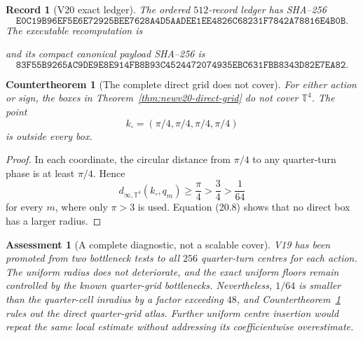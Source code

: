 \documentclass[11pt,oneside]{article}
\newtheorem{assessment}[theorem]{Assessment}
\newtheorem{record}[theorem]{Record}
\newtheorem{countertheorem}[theorem]{Countertheorem}
\theoremstyle{definition}
\theoremstyle{remark}
\begin{document}
\begin{record}[V20 exact ledger]
\label{rec:newv20-ledger}
The ordered \(512\)-record ledger has SHA--256
\[
\texttt{E0C19B96EF5E6E72925BEE7628A4D5AADEE1EE4826C68231F7842A78816E4B0B}.
                                                               \tag{20.9}
\]
The executable recomputation is
\begin{center}
\footnotesize
{}
\end{center}
and its compact canonical payload SHA--256 is
\[
\texttt{83F55B9265AC9DE9E8E914FB8B93C4524472074935EBC631FBB8343D82E7EA82}.
                                                               \tag{20.10}
\]
\end{record}

\begin{countertheorem}[The complete direct grid does not cover]
\label{ctr:newv20-no-cover}
For either action or sign, the boxes in
Theorem~\ref{thm:newv20-direct-grid} do not cover
\(\mathbb T^4\).  The point
\[
 k_\square=(\pi/4,\pi/4,\pi/4,\pi/4)                    \tag{20.11}
\]
is outside every box.
\end{countertheorem}

\begin{proof}
In each coordinate, the circular distance from \(\pi/4\) to any
quarter-turn phase is at least \(\pi/4\).  Hence
\[
 d_{\infty,\mathbb T^4}(k_\square,q_m)
 \ge\frac{\pi}{4}>\frac34>\frac1{64}                    \tag{20.12}
\]
for every \(m\), where only \(\pi>3\) is used.  Equation (20.8)
shows that no direct box has a larger radius.
\end{proof}

\begin{assessment}[A complete diagnostic, not a scalable cover]
\label{ass:newv20}
V19 has been promoted from two bottleneck tests to all \(256\)
quarter-turn centres for each action.  The uniform radius does not
deteriorate, and the exact uniform floors remain controlled by the
known quarter-grid bottlenecks.  Nevertheless, \(1/64\) is smaller
than the quarter-cell inradius by a factor exceeding \(48\), and
Countertheorem~\ref{ctr:newv20-no-cover} rules out the direct
quarter-grid atlas.  Further uniform centre insertion would repeat
the same local estimate without addressing its coefficientwise
overestimate.
\end{assessment}
\end{document}
